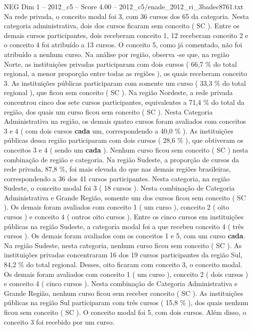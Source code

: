\begin{textsample}{NEG Dim 1 – 2012\_c5 – Score 4.00 – 2012\_c5/enade\_2012\_ri\_3badec8761.txt}
Na rede privada, o conceito modal foi 3, com 36 cursos dos 65 da categoria.
Nesta categoria administrativa, dois dos cursos ficaram sem conceito ( SC ).
Entre os demais cursos participantes, dois receberam conceito 1, 12 receberam conceito 2 e o conceito 4 foi atribuído a 13 cursos.
O conceito 5, como já comentado, não foi atribuído a nenhum curso.
Na análise por região, observa -se que, na região Norte, as instituições privadas participaram com dois cursos ( 66,7 \% do total regional, a menor proporção entre todas as regiões ), os quais receberam conceito 3.
As instituições públicas participaram com somente um curso ( 33,3 \% do total regional ), que ficou sem conceito ( SC ).
Na região Nordeste, a rede privada concentrou cinco dos sete cursos participantes, equivalentes a 71,4 \% do total da região, dos quais um curso ficou sem conceito ( SC ).
Nesta Categoria Administrativa na região, os demais quatro cursos foram avaliados com conceitos 3 e 4 ( com dois cursos \textbf{cada} um, correspondendo a 40,0 \% ).
As instituições públicas dessa região participaram com dois cursos ( 28,6 \% ), que obtiveram os conceitos 3 e 4 ( sendo um \textbf{cada} ).
Nenhum curso ficou sem conceito ( SC ) nesta combinação de região e categoria.
Na região Sudeste, a proporção de cursos da rede privada, 87,8 \%, foi mais elevada do que nas demais regiões brasileiras, correspondendo a 36 dos 41 cursos participantes.
Nesta categoria, na região Sudeste, o conceito modal foi 3 ( 18 cursos ).
Nesta combinação de Categoria Administrativa e Grande Região, somente um dos cursos ficou sem conceito ( SC ).
Os demais foram avaliados com conceito 1 ( um curso ), conceito 2 ( oito cursos ) e conceito 4 ( outros oito cursos ).
Entre os cinco cursos em instituições públicas na região Sudeste, a categoria modal foi a que recebeu conceito 4 ( três cursos ).
Os demais foram avaliados com os conceitos 1 e 5, com um curso \textbf{cada}.
Na região Sudeste, nesta categoria, nenhum curso ficou sem conceito ( SC ).
As instituições privadas concentraram 16 dos 19 cursos participantes da região Sul, 84,2 \% do total regional.
Desses, oito ficaram com conceito 3, o conceito modal.
Os demais foram avaliados com conceito 1 ( um curso ), conceito 2 ( dois cursos ) e conceito 4 ( cinco cursos ).
Nesta combinação de Categoria Administrativa e Grande Região, nenhum curso ficou sem receber conceito ( SC ).
As instituições públicas na região Sul participaram com três cursos ( 15,8 \% ), dos quais nenhum ficou sem conceito ( SC ).
O conceito modal foi 5, com dois cursos.
Além disso, o conceito 3 foi recebido por um curso.

\end{textsample}
